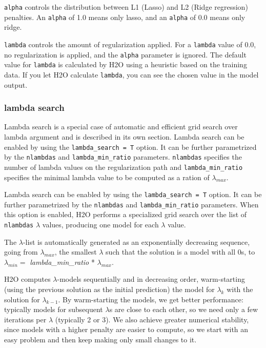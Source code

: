 \texttt{alpha} controls the distribution between L1 (Lasso) and L2 (Ridge regression) penalties.  An \texttt{alpha} 
of 1.0 means only lasso, and an \texttt{alpha} of 0.0 means only ridge.

\texttt{lambda} controls the amount of regularization applied.  For a \texttt{lambda} value of 0.0, no 
regularization is applied, and the \texttt{alpha} parameter is ignored.  The default value for \texttt{lambda} is
calculated by H2O using a heuristic based on the training data.  If you let H2O calculate \texttt{lambda}, you can
see the chosen value in the model output.

\subsubsection{lambda search}

Lambda search is a special case of automatic and efficient grid search over lambda argument and is described in its
own section. Lambda search can be enabled by using the \texttt{lambda\_search = T} option. It can be further
parametrized by the \texttt{nlambdas} and \texttt{lambda\_min\_ratio} parameters.
\texttt{nlambdas} specifies the number of lambda values on the regularization path and \texttt{lambda\_min\_ratio} 
specifies the minimal lambda value to be computed as a ration of $\lambda_{max}$.

Lambda search can be enabled by using the \texttt{lambda\_search = T} option. It can be further parametrized by
the \texttt{nlambdas} and \texttt{lambda\_min\_ratio} parameters. When this option is enabled, H2O performs a
specialized grid search over the list of \texttt{nlambdas} $\lambda$ values, producing one model for each $\lambda$
value.

The $\lambda$-list is automatically generated as an exponentially decreasing sequence, going from $\lambda_{max}$,
the smallest $\lambda$ such that the solution is a model with all 0s, to $\lambda_{min} =
$ \textit{lambda\_min\_ratio} * $ \lambda_{max}$.

H2O computes $\lambda$-models sequentially and in decreasing order, warm-starting (using the previous solution as
the initial prediction) the model for $\lambda_k$ with the solution for $\lambda_{k-1}$. By warm-starting the
models, we get better performance: typically models for subsequent $\lambda$s are close to each other, so we need
only a few iterations per $\lambda$ (typically 2 or 3). We also achieve greater numerical stability, since models
with a higher penalty are easier to compute, so we start with an easy problem and then keep making only small
changes to it.

